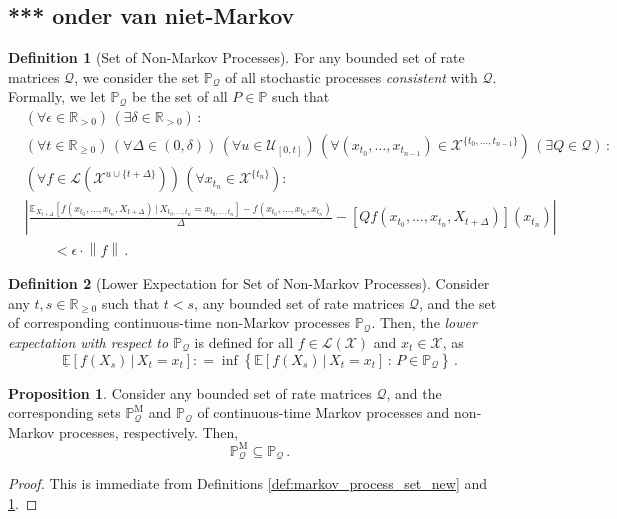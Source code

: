 \documentclass[10pt]{paper}
\theoremstyle{definition}
\newtheorem{proposition}[theorem]{Proposition}
\newtheorem{definition}{Definition}
\newcommand{\reals}{\mathbb{R}}
\newcommand{\realspos}{\reals_{>0}}
\newcommand{\realsnonneg}{\reals_{\geq 0}}
\newcommand{\states}{\mathcal{X}}
\newcommand{\processes}{\mathbb{P}}
\newcommand{\mprocesses}{\processes^{\mathrm{M}}}
\newcommand{\gambles}{\mathcal{L}}
\newcommand{\gamblesX}{\gambles(\states)}
\newcommand{\rateset}{\mathcal{Q}}
\newcommand{\norm}[1]{\left\lVert #1 \right\rVert}
\newcommand{\abs}[1]{\left\vert #1 \right\vert}
\newcommand{\coloneqq}{:\!=}
\begin{document}
\subsection{*** onder van niet-Markov}

\begin{definition}[Set of Non-Markov Processes]\label{def:set_non_markov_process}
For any bounded set of rate matrices $\rateset$, we consider the set $\processes_\rateset$ of all stochastic processes \emph{consistent} with $\rateset$. Formally, we let $\processes_\rateset$ be the set of all $P\in\processes$ such that
\begin{align*}
&(\forall\epsilon\in\realspos)\,(\exists\delta\in\realspos)\,: \\
 &(\forall t\in\realsnonneg)\,(\forall\Delta\in(0,\delta))\,(\forall u\in\mathcal{U}_{[0,t]})\,(\forall(x_{t_0},\ldots,x_{t_{n-1}})\in\states^{\{t_0,\ldots,t_{n-1}\}})\,(\exists Q\in\rateset)\,: \\
 &(\forall f\in\gambles(\states^{u\cup\{t+\Delta\}}))\,(\forall x_{t_n}\in\states^{\{t_n\}}): \\
 &\abs{\frac{\mathbb{E}_{X_{t+\Delta}}[f(x_{t_0},\ldots,x_{t_n},X_{t+\Delta})\,\vert\,X_{t_0,\ldots,t_n}=x_{t_0,\ldots,t_n}] - f(x_{t_0},\ldots,x_{t_n},x_{t_n})}{\Delta} - \left[Q f(x_{t_0},\ldots,x_{t_{n}},X_{t+\Delta})\right](x_{t_n})} \\ 
 &\quad\quad < \epsilon\cdot\norm{f}\,.
\end{align*}
\end{definition}

\begin{definition}[Lower Expectation for Set of Non-Markov Processes]\label{def:lower_non_markov} Consider any $t,s\in\realsnonneg$ such that $t<s$, any bounded set of rate matrices $\rateset$, and the set of corresponding continuous-time non-Markov processes $\processes_\rateset$. Then, the \emph{lower expectation with respect to $\processes_\rateset$} is defined for all $f\in\gamblesX$ and $x_t\in\states$, as
\begin{equation*}
\underline{\mathbb{E}}[f(X_s)\,\vert\,X_t=x_t] \coloneqq \inf\left\{\mathbb{E}[f(X_s)\,\vert\,X_t=x_t]\,:\,P\in\processes_\rateset\right\}\,.
\end{equation*}
\end{definition}

\begin{proposition}\label{prop:markov_set_subset_of_nonmarkov_set}
Consider any bounded set of rate matrices $\rateset$, and the corresponding sets $\mprocesses_\rateset$ and $\processes_\rateset$ of continuous-time Markov processes and non-Markov processes, respectively. Then,
\begin{equation*}
\mprocesses_\rateset \subseteq \processes_\rateset\,.
\end{equation*}
\end{proposition}
\begin{proof}
This is immediate from Definitions \ref{def:markov_process_set_new} and \ref{def:set_non_markov_process}.
\end{proof}
\end{document}
